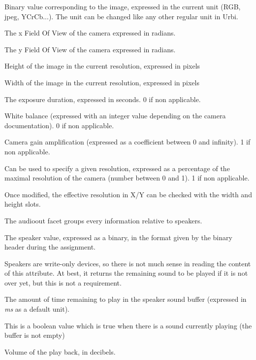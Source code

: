 \begin{slots}
  {%
    Binary value corresponding to the image, expressed in the current
    unit (RGB, jpeg, YCrCb...). The unit can be changed like any other
    regular unit in Urbi. %
  }

  {%
    The x Field Of View of the camera expressed in radians.%
  }

  {%
    The y Field Of View of the camera expressed in radians.%
  }

  {%
    Height of the image in the current resolution, expressed in
    pixels%
  }

  {%
    Width of the image in the current resolution, expressed in pixels%
  }

  {%
    The exposure duration, expressed in seconds. 0 if non applicable.%
  }

  {%
    White balance (expressed with an integer value depending on the
    camera documentation). 0 if non applicable.%
  }

  {%
    Camera gain amplification (expressed as a coefficient between 0
    and infinity). 1 if non applicable.%
  }

  {%
    Can be used to specify a given resolution, expressed as a
    percentage of the maximal resolution of the camera (number between
    0 and 1). 1 if non applicable.

    Once modified, the effective resolution in X/Y can be checked with
    the width and height slots.%
  }

\end{slots}

The audioout facet groups every information relative to speakers.

\begin{slots}
  {%
    The speaker value, expressed as a binary, in the format given by
    the binary header during the assignment.

    Speakers are write-only devices, so there is not much sense in
    reading the content of this attribute. At best, it returns the
    remaining sound to be played if it is not over yet, but this is
    not a requirement.%
  }

  {%
    The amount of time remaining to play in the speaker sound buffer
    (expressed in \textit{ms} as a default unit).%
  }

  {%
    This is a boolean value which is true when there is a sound
    currently playing (the buffer is not empty)%
  }

  {%
    Volume of the play back, in decibels.%
  }
\end{slots}



